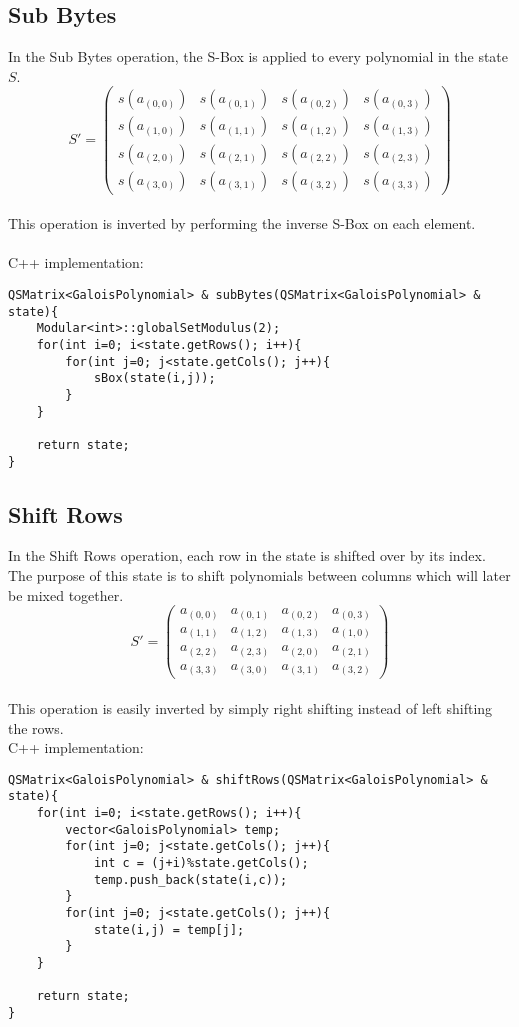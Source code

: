 \documentclass{article}
\begin{document}
\subsection{Sub Bytes}

In the Sub Bytes operation, the S-Box is applied to every polynomial in the state $S$.
\[ S' = \left( \begin{array}{cccc}
s(a_{(0,0)}) & s(a_{(0,1)}) & s(a_{(0,2)}) & s(a_{(0,3)}) \\
s(a_{(1,0)}) & s(a_{(1,1)}) & s(a_{(1,2)}) & s(a_{(1,3)}) \\
s(a_{(2,0)}) & s(a_{(2,1)}) & s(a_{(2,2)}) & s(a_{(2,3)}) \\
s(a_{(3,0)}) & s(a_{(3,1)}) & s(a_{(3,2)}) & s(a_{(3,3)}) \end{array} \right)\] 
\hfill\\
This operation is inverted by performing the inverse S-Box on each element.\\\\
C++ implementation:
\begin{lstlisting}
QSMatrix<GaloisPolynomial> & subBytes(QSMatrix<GaloisPolynomial> & state){
    Modular<int>::globalSetModulus(2);
    for(int i=0; i<state.getRows(); i++){
        for(int j=0; j<state.getCols(); j++){
            sBox(state(i,j));
        }
    }
    
    return state;
}
\end{lstlisting}

\subsection{Shift Rows}

In the Shift Rows operation, each row in the state is shifted over by its index.  The purpose of this state is to shift polynomials between columns which will later be mixed together.
\[ S' = \left( \begin{array}{cccc}
a_{(0,0)} & a_{(0,1)} & a_{(0,2)} & a_{(0,3)} \\
a_{(1,1)} & a_{(1,2)} & a_{(1,3)} & a_{(1,0)} \\
a_{(2,2)} & a_{(2,3)} & a_{(2,0)} & a_{(2,1)} \\
a_{(3,3)} & a_{(3,0)} & a_{(3,1)} & a_{(3,2)} \end{array} \right)\]
\hfill\\
This operation is easily inverted by simply right shifting instead of left shifting the rows.\\
C++ implementation:
\begin{lstlisting}
QSMatrix<GaloisPolynomial> & shiftRows(QSMatrix<GaloisPolynomial> & state){
    for(int i=0; i<state.getRows(); i++){
        vector<GaloisPolynomial> temp;
        for(int j=0; j<state.getCols(); j++){
            int c = (j+i)%state.getCols();
            temp.push_back(state(i,c));
        }
        for(int j=0; j<state.getCols(); j++){
            state(i,j) = temp[j];
        }
    }
    
    return state;
}
\end{lstlisting}
\end{document}
